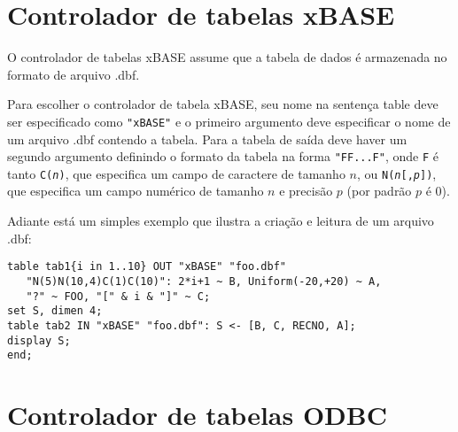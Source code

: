 \documentclass[11pt, brazil]{report}
\begin{document}
\section{Controlador de tabelas xBASE}

O controlador de tabelas xBASE assume que a tabela de dados é armazenada no
formato de arquivo .dbf.

Para escolher o controlador de tabela xBASE, seu nome na sentença table deve ser
especificado como \verb|"xBASE"| e o primeiro argumento deve especificar o nome
de um arquivo .dbf contendo a tabela. Para a tabela de saída deve haver um
segundo argumento definindo o formato da tabela na forma
\verb|"FF...F"|, onde \verb|F| é tanto {\tt C({\it n})},
que especifica um campo de caractere de tamanho $n$, ou
{\tt N({\it n}{\rm [},{\it p}{\rm ]})}, que especifica um campo numérico
de tamanho $n$ e precisão $p$ (por padrão $p$ é 0).

Adiante está um simples exemplo que ilustra a criação e leitura de um arquivo .dbf:

\begin{verbatim}
table tab1{i in 1..10} OUT "xBASE" "foo.dbf"
   "N(5)N(10,4)C(1)C(10)": 2*i+1 ~ B, Uniform(-20,+20) ~ A,
   "?" ~ FOO, "[" & i & "]" ~ C;
set S, dimen 4;
table tab2 IN "xBASE" "foo.dbf": S <- [B, C, RECNO, A];
display S;
end;
\end{verbatim}


%
%
%

\section{Controlador de tabelas ODBC}
\end{document}
